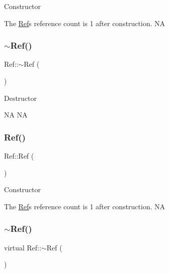Constructor

The \hyperlink{classRef}{Ref}\textquotesingle{}s reference count is 1 after construction.  NA \mbox{\label{classRef_a1c3c3986014151251b39041e2556d2e3}} 
\subsubsection{\texorpdfstring{$\sim$\+Ref()}{~Ref()}\hspace{0.1cm}{\footnotesize\ttfamily [1/2]}}
{\footnotesize\ttfamily Ref\+::$\sim$\+Ref (\begin{DoxyParamCaption}{ }\end{DoxyParamCaption})\hspace{0.3cm}{\ttfamily [virtual]}}

Destructor

NA  NA \mbox{\label{classRef_a63f1608b3c105a76e3d0ff1b77d2ae8e}} 
\subsubsection{\texorpdfstring{Ref()}{Ref()}\hspace{0.1cm}{\footnotesize\ttfamily [2/2]}}
{\footnotesize\ttfamily Ref\+::\+Ref (\begin{DoxyParamCaption}{ }\end{DoxyParamCaption})\hspace{0.3cm}{\ttfamily [protected]}}

Constructor

The \hyperlink{classRef}{Ref}\textquotesingle{}s reference count is 1 after construction.  NA \mbox{\label{classRef_a97a445f43f3935f3ee6f34ebdec55d12}} 
\subsubsection{\texorpdfstring{$\sim$\+Ref()}{~Ref()}\hspace{0.1cm}{\footnotesize\ttfamily [2/2]}}
{\footnotesize\ttfamily virtual Ref\+::$\sim$\+Ref (\begin{DoxyParamCaption}{ }\end{DoxyParamCaption})\hspace{0.3cm}{\ttfamily [virtual]}}

